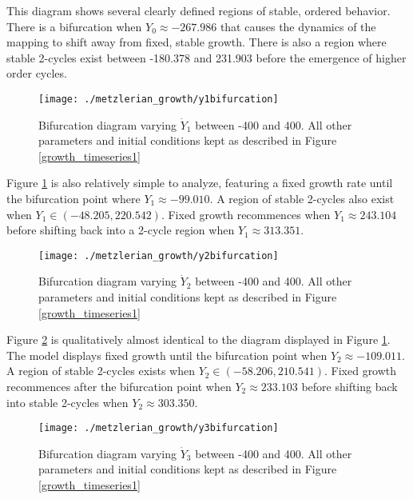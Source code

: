 This diagram shows several clearly defined regions of stable, ordered behavior. There is a bifurcation when $Y_0\approx -267.986$ that causes the dynamics of the mapping to shift away from fixed, stable growth. There is also a region where stable 2-cycles exist between -180.378 and 231.903 before the emergence of higher order cycles. 

\begin{figure}
    \centering
    \texttt{[image: ./metzlerian\_growth/y1bifurcation]}
    \caption{Bifurcation diagram varying $\dot Y_1$ between -400 and 400. All other parameters and initial conditions kept as described in Figure \ref{growth_timeseries1}}
    \label{metzlerian_growth-y1bifurcation}
\end{figure}

Figure \ref{metzlerian_growth-y1bifurcation} is also relatively simple to analyze, featuring a fixed growth rate until the bifurcation point where $Y_1\approx -99.010$. A region of stable 2-cycles also exist when $Y_1\in(-48.205,220.542)$. Fixed growth recommences when $Y_1\approx 243.104$ before shifting back into a 2-cycle region when $Y_1\approx 313.351$. 

\begin{figure}
    \centering
    \texttt{[image: ./metzlerian\_growth/y2bifurcation]}
    \caption{Bifurcation diagram varying $\dot Y_2$ between -400 and 400. All other parameters and initial conditions kept as described in Figure \ref{growth_timeseries1}}
    \label{metzlerian_growth-y2bifurcation}
\end{figure}

Figure \ref{metzlerian_growth-y2bifurcation} is qualitatively almost identical to the diagram displayed in Figure \ref{metzlerian_growth-y1bifurcation}. The model displays fixed growth until the bifurcation point when $Y_2\approx -109.011$. A region of stable 2-cycles exists when $Y_2\in(-58.206, 210.541)$. Fixed growth recommences after the bifurcation point when $Y_2\approx 233.103$ before shifting back into stable 2-cycles when $Y_2\approx 303.350$. 

\begin{figure}
    \centering
    \texttt{[image: ./metzlerian\_growth/y3bifurcation]}
    \caption{Bifurcation diagram varying $\dot Y_3$ between -400 and 400. All other parameters and initial conditions kept as described in Figure \ref{growth_timeseries1}}
    \label{metzlerian_growth-y3bifurcation}
\end{figure}

